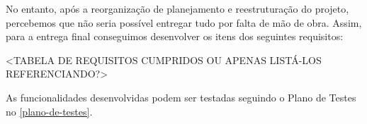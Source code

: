 No entanto, após a reorganização de planejamento e reestruturação do projeto, percebemos que não seria possível entregar tudo por falta de mão de obra. Assim, para a entrega final conseguimos desenvolver os itens dos seguintes requisitos:

<TABELA DE REQUISITOS CUMPRIDOS OU APENAS LISTÁ-LOS REFERENCIANDO?>

As funcionalidades desenvolvidas podem ser testadas seguindo o Plano de Testes no \autoref{plano-de-testes}.